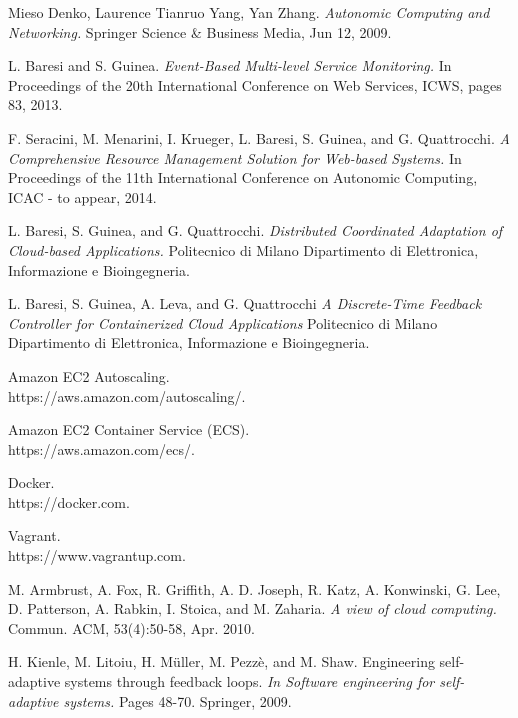 
\begin{thebibliography}{9}

Mieso Denko, Laurence Tianruo Yang, Yan Zhang.
\textit{Autonomic Computing and Networking.}
Springer Science \& Business Media, Jun 12, 2009.

L. Baresi and S. Guinea.
\textit{Event-Based Multi-level
Service Monitoring.}
In Proceedings of the 20th
International Conference on Web Services, ICWS, pages 83, 2013.

F. Seracini, M. Menarini, I. Krueger, L. Baresi,
S. Guinea, and G. Quattrocchi.
\textit{A Comprehensive
Resource Management Solution for Web-based
Systems.}
 In Proceedings of the 11th International
Conference on Autonomic Computing, ICAC - to
appear, 2014.

L. Baresi,
S. Guinea, and G. Quattrocchi.
\textit{Distributed Coordinated Adaptation
of Cloud-based Applications.}
Politecnico di Milano
Dipartimento di Elettronica, Informazione e Bioingegneria.

L. Baresi, S. Guinea, A. Leva, and G. Quattrocchi
\textit{A Discrete-Time Feedback Controller
for Containerized Cloud Applications}
Politecnico di Milano
Dipartimento di Elettronica, Informazione e Bioingegneria.

Amazon EC2 Autoscaling.\\
https://aws.amazon.com/autoscaling/.

Amazon EC2 Container Service (ECS).\\
https://aws.amazon.com/ecs/.

Docker. \\
https://docker.com.

Vagrant.  \\
https://www.vagrantup.com.

M. Armbrust, A. Fox, R. Griffith, A. D. Joseph,
R. Katz, A. Konwinski, G. Lee, D. Patterson,
A. Rabkin, I. Stoica, and M. Zaharia.
\textit{A view of cloud
computing.}
Commun. ACM, 53(4):50-58, Apr. 2010.

H. Kienle, M. Litoiu, H. Müller, M. Pezzè, and
M. Shaw. Engineering self-adaptive systems through
feedback loops.
\textit{In Software engineering for
self-adaptive systems.}
Pages 48-70. Springer, 2009.


\end{thebibliography}
